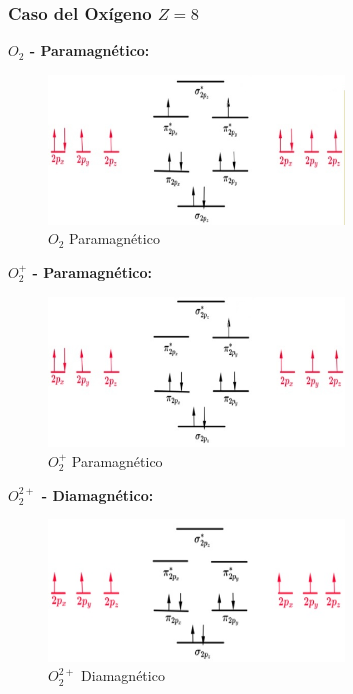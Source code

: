 \newpage
\subsubsection{Caso del Oxígeno $Z=8$}


\textbf{$O_{2}$ - Paramagnético:}

\begin{figure}[H]
    \centering
    \includegraphics[width=0.7\textwidth]{./Figures/interaccionCruzadaOxigenoA}
	\caption{$O_{2}$ Paramagnético}
	\label{fig:interaccionCruzadaOxigenoA}
\end{figure}

\textbf{$O_{2}^{+}$ - Paramagnético:}

\begin{figure}[H]
    \centering
    \includegraphics[width=0.7\textwidth]{./Figures/interaccionCruzadaOxigenoC}
	\caption{$O_{2}^{+}$ Paramagnético}
	\label{fig:interaccionCruzadaOxigenoC}
\end{figure}


\textbf{$O_{2}^{2+}$ - Diamagnético:}

\begin{figure}[H]
    \centering
    \includegraphics[width=0.7\textwidth]{./Figures/interaccionCruzadaOxigenoB}
	\caption{$O_{2}^{2+}$ Diamagnético}
	\label{fig:interaccionCruzadaOxigenoB}
\end{figure}



